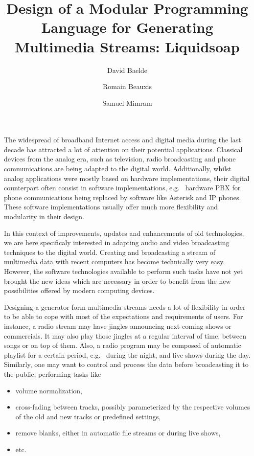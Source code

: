 \documentclass{llncs}
\title{Design of a Modular Programming Language for Generating Multimedia Streams: Liquidsoap}
\author{David Baelde \and Romain Beauxis \and Samuel Mimram}
\newcommand{\eg}{e.g.~}
\begin{document}
\maketitle

The widespread of broadband Internet access and digital media during the last
decade has attracted a lot of attention on their potential applications.
Classical devices from the analog era, such as television, radio broadcasting
and phone communications are being adapted to the digital world. Additionally,
whilst analog applications were mostly based on hardware implementations, their
digital counterpart often consist in software implementations, \eg{} hardware
PBX for phone communications being replaced by software like Asterisk and IP
phones. These software implementations usually offer much more flexibility and
modularity in their design.

In this context of improvements, updates and enhancements of old technologies,
we are here specificaly interested in adapting audio and video broadcasting
techniques to the digital world. Creating and broadcasting a stream of
multimedia data with recent computers has become technically very easy. However,
the software technologies available to perform such tasks have not yet brought
the new ideas which are necessary in order to benefit from the new possibilities
offered by modern computing devices.

Designing a generator form multimedia streams needs a lot of flexibility in
order to be able to cope with most of the expectations and requirements of
users. For instance, a radio stream may have jingles announcing next coming
shows or commercials. It may also play those jingles at a regular interval of
time, between songs or on top of them. Also, a radio program may be composed of
automatic playlist for a certain period, \eg{} during the night, and live shows
during the day. Similarly, one may want to control and process the data before
broadcasting it to the public, performing tasks like
\begin{itemize}
 \item volume normalization,
 \item cross-fading between tracks, possibly parameterized by the respective
   volumes of the old and new tracks or predefined settings,
 \item remove blanks, either in automatic file streams or during live shows,
 \item etc.
\end{itemize}
\end{document}
